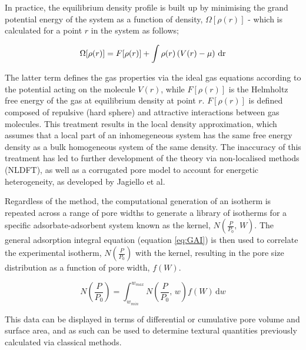 In practice, the equilibrium density profile is built up by minimising the grand potential energy of the system as a function of density, $\Omega[\rho(r)]$ - which is calculated for a point $r$ in the system as follows;

\begin{equation}
\Omega[\rho(r)] = F[\rho(r)] + \int \rho(r)\left(V(r) - \mu\right) \,\rm{d}r
\end{equation}

The latter term defines the gas properties via the ideal gas equations according to the potential acting on the molecule $V(r)$, while $F[\rho(r)]$ is the Helmholtz free energy of the gas at equilibrium density at point $r$. $F[\rho(r)]$ is defined composed of repulsive (hard sphere) and attractive interactions between gas molecules. This treatment results in the local density approximation, which assumes that a local part of an inhomegeneous system has the same free energy density as a bulk homogeneous system of the same density. The inaccuracy of this treatment has led to further development of the theory via non-localised methods (NLDFT),  \citep{tarazona1987phase, lastoskie1993pore, landers2013density} 
as well as a corrugated pore model to account for energetic heterogeneity, as developed by Jagiello et al.\citep{Jagiello20132D}

Regardless of the method, the computational generation of an isotherm is repeated across a range of pore widths to generate a library of isotherms for a specific \gls{adsorbate}-\gls{adsorbent} system known as the kernel, $N\left(\frac{P}{P_0}, \, W\right)$. The general \gls{adsorption} integral equation (equation \ref{eq:GAI}) is then used to correlate the experimental isotherm, $N\left(\frac{P}{P_0}\right)$  with the kernel, resulting in the pore size distribution as a function of pore width, $f(W)$.\citep{Thommes2015Physisorption}

\begin{equation} \label{eq:GAI}
    N\left(\frac{P}{P_0}\right) = \int_{w_{min}}^{w_{max}} N\left(\frac{P}{P_0}, \, w \right) f(W) \, \mathrm{d}w
\end{equation}

This data can be displayed in terms of differential or cumulative pore volume and surface area, and as such can be used to determine textural quantities previously calculated via classical methods.

